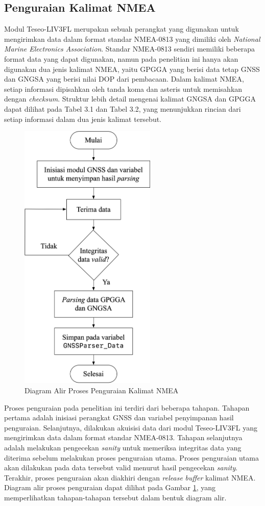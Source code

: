 \subsection{Penguraian Kalimat NMEA}
Modul Teseo\hyp{}LIV3FL merupakan sebuah perangkat yang digunakan untuk mengirimkan data dalam format standar NMEA-0813 yang dimiliki oleh \textit{National Marine Electronics Association}. Standar NMEA-0813 sendiri memiliki beberapa format data yang dapat digunakan, namun pada penelitian ini hanya akan digunakan dua jenis kalimat NMEA, yaitu GPGGA yang berisi data tetap GNSS dan GNGSA yang berisi nilai DOP dari pembacaan. Dalam kalimat NMEA, setiap informasi dipisahkan oleh tanda koma dan asteris untuk memisahkan dengan \textit{checksum}. Struktur lebih detail mengenai kalimat GNGSA dan GPGGA dapat dilihat pada Tabel 3.1 dan Tabel 3.2, yang menunjukkan rincian dari setiap informasi dalam dua jenis kalimat tersebut.

\begin{figure}[H]
	\centering
	\includegraphics[width=6.5cm]{contents/chapter-3/diagram-parser.png}
	\caption{Diagram Alir Proses Penguraian Kalimat NMEA}
	\label{Fig: flowchart-parsing}
\end{figure}

Proses penguraian pada penelitian ini terdiri dari beberapa tahapan. Tahapan pertama adalah inisiasi perangkat GNSS dan variabel penyimpanan hasil penguraian. Selanjutnya, dilakukan akuisisi data dari modul Teseo\hyp{}LIV3FL yang mengirimkan data dalam format standar NMEA-0813. Tahapan selanjutnya adalah melakukan pengecekan \textit{sanity} untuk memeriksa integritas data yang diterima sebelum melakukan proses penguraian utama. Proses penguraian utama akan dilakukan pada data tersebut valid menurut hasil pengecekan \textit{sanity}. Terakhir, proses penguraian akan diakhiri dengan \textit{release} \textit{buffer} kalimat NMEA. Diagram alir proses penguraian dapat dilihat pada Gambar \ref{Fig: flowchart-parsing}, yang memperlihatkan tahapan-tahapan tersebut dalam bentuk diagram alir.

